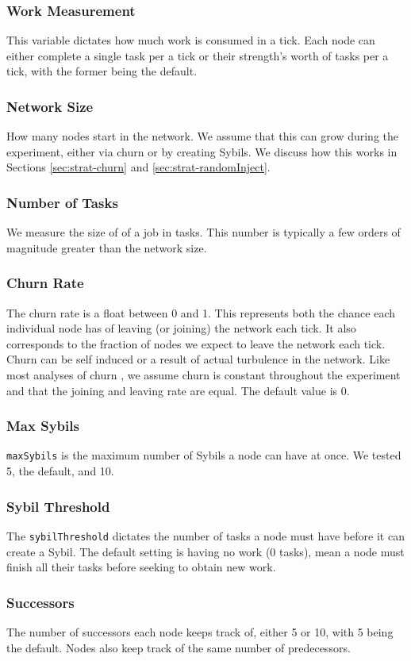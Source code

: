 \documentclass[10pt,conference]{IEEEtran}
\begin{document}
\subsubsection*{Work Measurement} This variable dictates how much work is consumed in a tick.
Each node can either complete a single task per a tick or their strength's worth of tasks per a tick, with the former being the default.
\subsubsection*{Network Size}  How many nodes start in the network.  
We assume that this can grow during the experiment, either via churn or by creating Sybils.
We discuss how this works in Sections \ref{sec:strat-churn} and \ref{sec:strat-randomInject}.
\subsubsection*{Number of Tasks} We measure the size of of a job in tasks.
This number is typically a few orders of magnitude greater than the network size.
\subsubsection*{Churn Rate} The churn rate is a float between 0 and 1.
This represents both the chance each individual node has of leaving (or joining) the network each tick.
It also corresponds to the fraction of nodes we expect to leave the network each tick.
Churn can be self induced or a result of actual turbulence in the network.
Like most analyses of churn \cite{marozzo2012p2p}, we assume churn is constant throughout the experiment and that the joining and leaving rate are equal.
The default value is 0.
\subsubsection*{Max Sybils} \texttt{maxSybils} is the maximum number of Sybils a node can have at once.  We tested 5, the default, and 10.
\subsubsection*{Sybil Threshold} The \texttt{sybilThreshold} dictates the number of tasks a node must have before it can create a Sybil.  The default setting is having no work (0 tasks), mean a node must finish all their tasks before seeking to obtain new work.
\subsubsection*{Successors} The number of successors each node keeps track of, either 5 or 10, with 5 being the default.
Nodes also keep track of the same number of predecessors.
	
\end{document}
